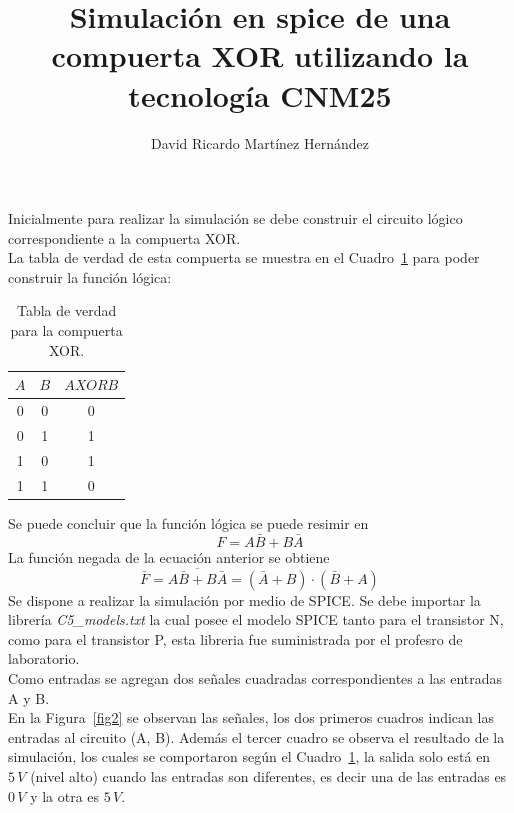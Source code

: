 \documentclass[11pt,graphicx,caption,rotating]{article}
\begin{document}
\title{\textbf{Simulación en spice de una compuerta XOR utilizando la tecnología CNM25}}
\author{David Ricardo Martínez Hernández}
\date{}
\maketitle
\noindent
Inicialmente para realizar la simulación se debe construir el circuito lógico correspondiente a la compuerta XOR.\\
La tabla de verdad de esta compuerta se muestra en el Cuadro~\ref{tab1} para poder construir la función lógica:
\begin{table}[H]
  \centering
    \begin{tabular}{|c|c|c|}\hline
      $A$ & $B$ & $A XOR B$ \\ \hline
      0 & 0 & 0 \\ \hline
      0 & 1 & 1 \\ \hline
      1 & 0 & 1 \\ \hline
      1 & 1 & 0 \\ \hline
    \end{tabular}
   \caption{Tabla de verdad para la compuerta XOR.}
  \label{tab1}
\end{table}
\noindent
Se puede concluir que la función lógica se puede resimir en 
$$F = A\bar{B} + B\bar{A}$$
La función negada de la ecuación anterior se obtiene
$$\bar{F} = \overline{A \bar{B} + B \bar{A}} = (\bar{A} + B)\cdot (\bar{B} + A) $$
\noindent
Se dispone a realizar la simulación por medio de SPICE. Se debe importar la librería \textit{C5\_models.txt} la cual posee el modelo SPICE tanto para el transistor N, como para el transistor P, esta libreria fue suministrada por el profesro de laboratorio.\\
Como entradas se agregan dos señales cuadradas correspondientes a las entradas A y B.\\
En la Figura~\ref{fig2} se observan las señales, los dos primeros cuadros indican las entradas al circuito (A, B). Además el tercer cuadro se observa el resultado de la simulación, los cuales se comportaron según el Cuadro~\ref{tab1}, la salida solo está en $5\, V$ (nivel alto) cuando las entradas son diferentes, es decir una de las entradas es $0\, V$ y la otra es $5\,V$.
\end{document}
